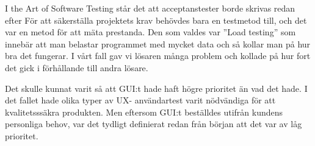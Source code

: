 	I the Art of Software Testing står det att acceptanstester borde skrivas redan efter
	För att säkerställa projektets krav behövdes bara en testmetod till, och det var en metod för att mäta prestanda. Den som valdes var ''Load testing'' som innebär att man belastar programmet med mycket data och så kollar man på hur bra det fungerar. I vårt fall gav vi lösaren många problem och kollade på hur fort det gick i förhållande till andra lösare. \newline
	
	Det skulle kunnat varit så att GUI:t hade haft högre prioritet än vad det hade. I det fallet hade olika typer av UX- användartest varit nödvändiga för att kvalitetsssäkra produkten. Men eftersom GUI:t beställdes utifrån kundens personliga behov, var det tydligt definierat redan från början att det var av låg prioritet. 
	
